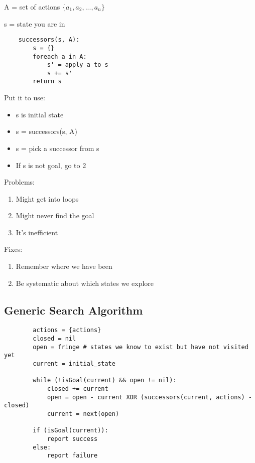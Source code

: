 \documentclass[english,openany]{book}
\begin{document}
    A = set of actions $\{a_1, a_2, ..., a_n\}$
    
    s = state you are in
    
    \begin{lstlisting}
    successors(s, A):
        s = {}
        foreach a in A:
            s' = apply a to s
            s += s'
        return s
    \end{lstlisting}
    
    Put it to use:
    
    \begin{itemize}
        \item s is initial state
        \item s = successors(s, A)
        \item s = pick a successor from s
        \item If s is not goal, go to 2
    \end{itemize}
    
    Problems:
    
    \begin{enumerate}[label=(\Alph*)]
        \item Might get into loops
        \item Might never find the goal
        \item It's inefficient
    \end{enumerate}
    
    Fixes:
    
    \begin{enumerate}[label=(\Alph*)]
        \item Remember where we have been
        \item Be systematic about which states we explore
    \end{enumerate}
    
    \newpage
    \subsection{Generic Search Algorithm}
    
    \begin{lstlisting}
        actions = {actions}
        closed = nil
        open = fringe # states we know to exist but have not visited yet
        current = initial_state
        
        while (!isGoal(current) && open != nil):
            closed += current
            open = open - current XOR (successors(current, actions) - closed)
            current = next(open)
            
        if (isGoal(current)):
            report success
        else:
            report failure
    \end{lstlisting}
    
\end{document}
